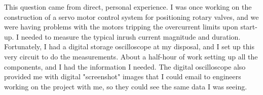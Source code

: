 





This question came from direct, personal experience.  I was once working on the construction of a servo motor control system for positioning rotary valves, and we were having problems with the motors tripping the overcurrent limits upon start-up.  I needed to measure the typical inrush current magnitude and duration.  Fortunately, I had a digital storage oscilloscope at my disposal, and I set up this very circuit to do the measurements.  About a half-hour of work setting up all the components, and I had the information I needed.  The digital oscilloscope also provided me with digital "screenshot" images that I could email to engineers working on the project with me, so they could see the same data I was seeing.  




